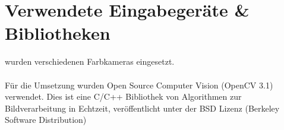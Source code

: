 \section{Verwendete Eingabegeräte \& Bibliotheken}
\label{hardware}
 wurden verschiedenen Farbkameras eingesetzt.\\
\\
Für die Umsetzung wurden Open Source Computer Vision (OpenCV 3.1) verwendet. Dies ist eine C/C++ Bibliothek von Algorithmen zur Bildverarbeitung in Echtzeit, veröffentlicht unter der BSD Lizenz (Berkeley
Software Distribution)\\
\cite{OpenCv_What_Is}\cite{wiki_Wha_is_OPenCV}